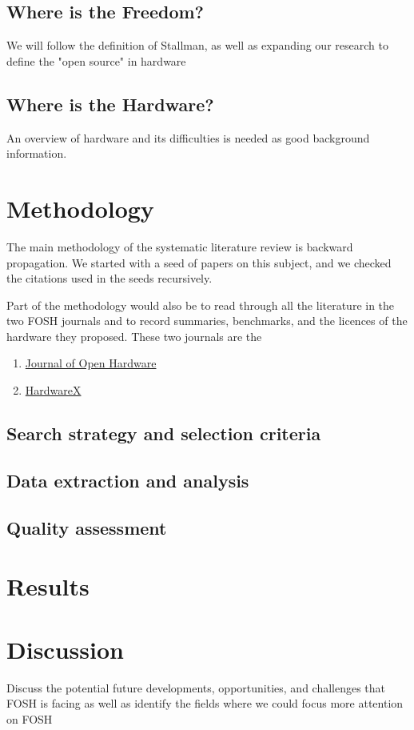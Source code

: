 \documentclass[acmtog]{acmart}
\begin{document}
\subsection{Where is the Freedom?}
We will follow the definition of Stallman\cite{b0_stallman}, as well as expanding our research to define the "open source" in hardware
\subsection{Where is the Hardware?}
An overview of hardware and its difficulties is needed as good background information. 

\section{Methodology}
The main methodology of the systematic literature review is backward propagation. 
We started with a seed of papers on this subject, and we checked the citations used in the seeds recursively. 

Part of the methodology would also be to read through all the literature in the two FOSH journals and to record summaries, benchmarks, and the licences of the hardware they proposed.
These two journals are the 
\begin{enumerate}
    \item \href{https://openhardware.metajnl.com/}{Journal of Open Hardware}
    \item \href{https://www.sciencedirect.com/journal/hardwarex}{HardwareX}
\end{enumerate}
\subsection{Search strategy and selection criteria}
\subsection{Data extraction and analysis}
\subsection{Quality assessment}



\section{Results}

\section{Discussion}
Discuss the potential future developments, opportunities, and challenges that FOSH is facing as well as identify the fields where we could focus more attention on FOSH  
\end{document}
